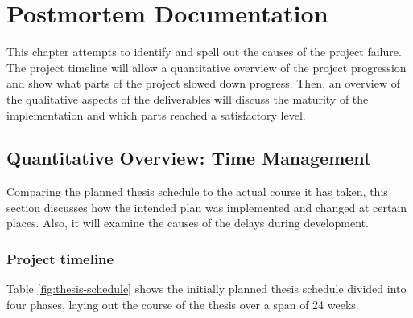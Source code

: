 \chapter{Postmortem Documentation}
\label{chap:postmortem}
This chapter attempts to identify and spell out the causes of the project failure. The project timeline will allow a quantitative overview of the project progression and show what parts of the project slowed down progress. Then, an overview of the qualitative aspects of the deliverables will discuss the maturity of the implementation and which parts reached a satisfactory level.

\section{Quantitative Overview: Time Management}
\label{sec:pm-time-management}
Comparing the planned thesis schedule to the actual course it has taken, this section discusses how the intended plan was implemented and changed at certain places. Also, it will examine the causes of the delays during development.
\subsection{Project timeline}
\label{sec:project-timeline}
Table \ref{fig:thesis-schedule} shows the initially planned thesis schedule divided into four phases, laying out the course of the thesis over a span of 24 weeks.

